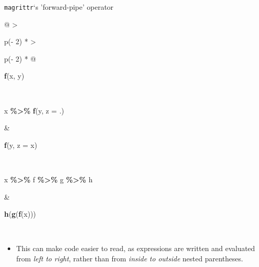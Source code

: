 \documentclass[
  11pt,
  ignorenonframetext,
]{beamer}
\newenvironment{Shaded}{\begin{snugshade}}{\end{snugshade}}
\newcommand{\AttributeTok}[1]{\textcolor[rgb]{0.13,0.29,0.53}{#1}}
\newcommand{\FunctionTok}[1]{\textcolor[rgb]{0.13,0.29,0.53}{\textbf{#1}}}
\newcommand{\NormalTok}[1]{#1}
\newcommand{\SpecialCharTok}[1]{\textcolor[rgb]{0.81,0.36,0.00}{\textbf{#1}}}
\providecommand{\tightlist}{%
  \setlength{\itemsep}{0pt}\setlength{\parskip}{0pt}}
\begin{document}
\begin{frame}[fragile]{\texttt{magrittr}`s 'forward-pipe' operator}
\begin{longtable}[]{@{}
  >{\raggedright\arraybackslash}p{(\columnwidth - 2\tabcolsep) * }
  >{\raggedright\arraybackslash}p{(\columnwidth - 2\tabcolsep) * }@{}}
\begin{minipage}[t]{\linewidth}
\begin{Shaded}
\begin{Highlighting}[]
\FunctionTok{f}\NormalTok{(x, y)}
\end{Highlighting}
\end{Shaded}
\end{minipage} \\
\begin{minipage}[t]{\linewidth}\raggedright
\begin{Shaded}
\begin{Highlighting}[]
\NormalTok{x }\SpecialCharTok{\%\textgreater{}\%} \FunctionTok{f}\NormalTok{(y, }\AttributeTok{z =}\NormalTok{ .)}
\end{Highlighting}
\end{Shaded}
\end{minipage} & \begin{minipage}[t]{\linewidth}\raggedright
\begin{Shaded}
\begin{Highlighting}[]
\FunctionTok{f}\NormalTok{(y, }\AttributeTok{z =}\NormalTok{ x)}
\end{Highlighting}
\end{Shaded}
\end{minipage} \\
\begin{minipage}[t]{\linewidth}\raggedright
\begin{Shaded}
\begin{Highlighting}[]
\NormalTok{x }\SpecialCharTok{\%\textgreater{}\%}\NormalTok{ f }\SpecialCharTok{\%\textgreater{}\%}\NormalTok{ g }\SpecialCharTok{\%\textgreater{}\%}\NormalTok{ h}
\end{Highlighting}
\end{Shaded}
\end{minipage} & \begin{minipage}[t]{\linewidth}\raggedright
\begin{Shaded}
\begin{Highlighting}[]
\FunctionTok{h}\NormalTok{(}\FunctionTok{g}\NormalTok{(}\FunctionTok{f}\NormalTok{(x)))}
\end{Highlighting}
\end{Shaded}
\end{minipage} \\
\bottomrule\noalign{}
\end{longtable}

\begin{itemize}
\tightlist
\item
  This can make code easier to read, as expressions are written and
  evaluated from \emph{left to right}, rather than from \emph{inside to
  outside} nested parentheses.
\end{itemize}
\end{frame}
\end{document}
